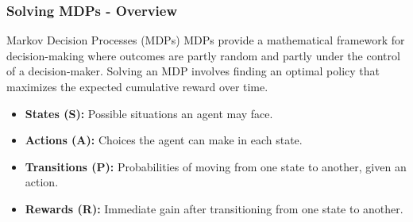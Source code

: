 \documentclass[aspectratio=169]{beamer}
\begin{document}
\begin{frame}[fragile]
    \frametitle{Solving MDPs - Overview}
    \begin{block}{Markov Decision Processes (MDPs)}
        MDPs provide a mathematical framework for decision-making where outcomes are partly random and partly under the control of a decision-maker. Solving an MDP involves finding an optimal policy that maximizes the expected cumulative reward over time.
    \end{block}

    \begin{itemize}
        \item \textbf{States (S):} Possible situations an agent may face.
        \item \textbf{Actions (A):} Choices the agent can make in each state.
        \item \textbf{Transitions (P):} Probabilities of moving from one state to another, given an action.
        \item \textbf{Rewards (R):} Immediate gain after transitioning from one state to another.
    \end{itemize}
\end{frame}
\end{document}
